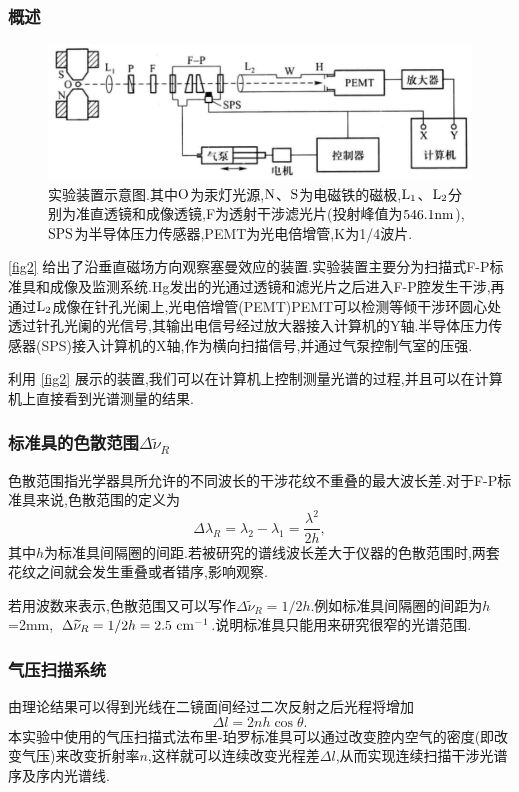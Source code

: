\documentclass[font=default]{mpltx}
\begin{document}
\subsubsection{概述}
\begin{figure}
    \centering
    \includegraphics[width=0.85\linewidth]{fig/02.png}
    \caption{实验装置示意图.其中${\rm O}$为汞灯光源,${\rm N}$、${\rm S}$为电磁铁的磁极,${\rm L_1}$、${\rm L_2}$分别为准直透镜和成像透镜,F为透射干涉滤光片(投射峰值为${546.1\rm nm}$),${\rm SPS}$为半导体压力传感器,PEMT为光电倍增管,K为1/4波片.}
    \label{fig2}
\end{figure}
\autoref{fig2} 给出了沿垂直磁场方向观察塞曼效应的装置.实验装置主要分为扫描式F-P标准具和成像及监测系统.Hg发出的光通过透镜和滤光片之后进入F-P腔发生干涉,再通过${\rm L_2}$成像在针孔光阑上,光电倍增管(PEMT)PEMT可以检测等倾干涉环圆心处透过针孔光阑的光信号,其输出电信号经过放大器接入计算机的Y轴.半导体压力传感器(SPS)接入计算机的X轴,作为横向扫描信号,并通过气泵控制气室的压强.

利用 \autoref{fig2} 展示的装置,我们可以在计算机上控制测量光谱的过程,并且可以在计算机上直接看到光谱测量的结果.
\subsubsection{标准具的色散范围$\Delta \widetilde{\nu}_R$}
色散范围指光学器具所允许的不同波长的干涉花纹不重叠的最大波长差.对于F-P标准具来说,色散范围的定义为$$\Delta\lambda_R=\lambda_2-\lambda_1=\frac{\lambda^2}{2h},$$其中$h$为标准具间隔圈的间距.若被研究的谱线波长差大于仪器的色散范围时,两套花纹之间就会发生重叠或者错序,影响观察.

若用波数来表示,色散范围又可以写作$\Delta \widetilde{\nu}_R=1/2h$.例如标准具间隔圈的间距为$h$=2mm,\ $\Delta \widetilde{\nu}_R=1/2h=2.5\ {\rm cm^{-1}}$.说明标准具只能用来研究很窄的光谱范围.
\subsubsection{气压扫描系统}
由理论结果可以得到光线在二镜面间经过二次反射之后光程将增加$$\Delta l=2nh\cos \theta.$$本实验中使用的气压扫描式法布里-珀罗标准具可以通过改变腔内空气的密度(即改变气压)来改变折射率$n$,这样就可以连续改变光程差$\Delta l$,从而实现连续扫描干涉光谱序及序内光谱线.
\end{document}
